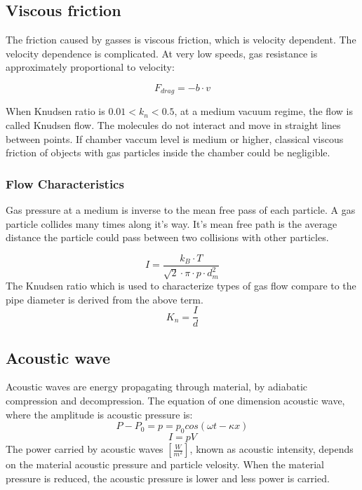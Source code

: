 \documentclass[\main/master.tex]{subfiles}
\begin{document}
\subsection{Viscous friction}
The friction caused by gasses is viscous friction, which is velocity dependent. The velocity dependence is complicated. At very low speeds, gas resistance is approximately proportional to velocity: 

\begin{equation}
F_{drag} = -b\cdot v  \label{eqn:energy-mass-equivalence-relation}
\end{equation}

When Knudsen ratio is $0.01<k_n<0.5$, at a medium vacuum regime, the flow is called Knudsen flow. The molecules do not interact and move in straight lines between points. If chamber vaccum level is medium or higher, classical viscous friction of objects with gas particles inside the chamber could be negligible.

\subsubsection{Flow Characteristics}
Gas pressure at a medium is inverse to the mean free pass of each particle. A gas particle collides many times along it's way. It's mean free path is the average distance the particle could pass between two collisions with other particles. 


\begin{equation}
I = \frac{k_B\cdot T}{\sqrt{2}\cdot\pi\cdot p\cdot d_m^2}     \label{eqn:mean-free-pass}
\end{equation}
The Knudsen ratio which is used to characterize types of gas flow compare to the pipe diameter is derived from the above term.
\begin{equation}
K_n = \frac{I}{d}     \label{eqn:mean-free-pass}
\end{equation}

\subsection{Acoustic wave}
Acoustic waves are energy propagating through material, by adiabatic compression and decompression. The equation of one dimension acoustic wave, where the amplitude is acoustic pressure is:
\begin{equation}
P-P_0 = p = p_0cos(\omega t -\kappa x)       \label{eqn:acoustic_pressure}
\end{equation}
\begin{equation}
I = pV      \label{eqn:acoustic_intensity}
\end{equation} 
The power carried by acoustic waves $[\frac{W}{m^2}]$, known as acoustic intensity, depends on the material acoustic pressure and particle velosity. When the material pressure is reduced, the acoustic pressure is lower and less power is carried.
\end{document}
